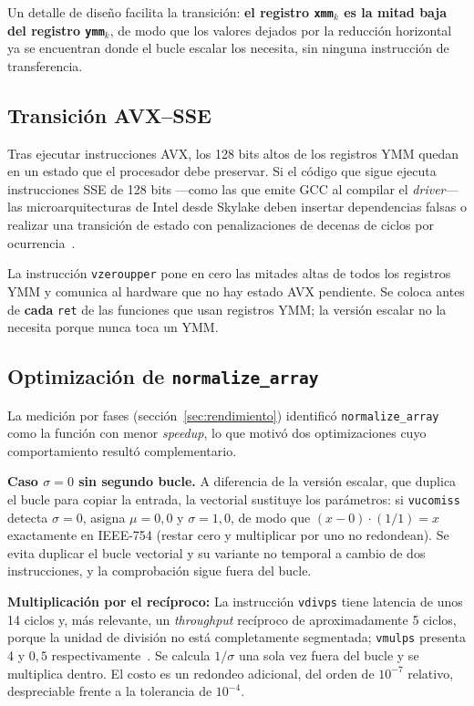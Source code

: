 \documentclass[journal]{IEEEtran}
\begin{document}
Un detalle de diseño facilita la transición: \textbf{el registro
\texttt{xmm}$_k$ es la mitad baja del registro \texttt{ymm}$_k$}, de modo
que los valores dejados por la reducción horizontal ya se encuentran
donde el bucle escalar los necesita, sin ninguna instrucción de
transferencia.

\subsection{Transición AVX--SSE}

Tras ejecutar instrucciones AVX, los 128 bits altos de los registros YMM
quedan en un estado que el procesador debe preservar. Si el código que
sigue ejecuta instrucciones SSE de 128 bits ---como las que emite GCC al
compilar el \textit{driver}--- las microarquitecturas de Intel desde
Skylake deben insertar dependencias falsas o realizar una transición de
estado con penalizaciones de decenas de ciclos por
ocurrencia~\cite{intel_optimization}.

La instrucción \texttt{vzeroupper} pone en cero las mitades altas de
todos los registros YMM y comunica al hardware que no hay estado AVX
pendiente. Se coloca antes de \textbf{cada} \texttt{ret} de las funciones
que usan registros YMM; la versión escalar no la necesita porque nunca
toca un YMM.

\subsection{Optimización de \texttt{normalize\_array}}
\label{sec:optimizacion}

La medición por fases (sección~\ref{sec:rendimiento}) identificó
\texttt{normalize\_array} como la función con menor \textit{speedup}, lo
que motivó dos optimizaciones cuyo comportamiento resultó
complementario.

\textbf{Caso $\sigma = 0$ sin segundo bucle.} A diferencia de la versión
escalar, que duplica el bucle para copiar la entrada, la vectorial
sustituye los parámetros: si \texttt{vucomiss} detecta $\sigma = 0$,
asigna $\mu = 0{,}0$ y $\sigma = 1{,}0$, de modo que
$(x - 0)\cdot(1/1) = x$ exactamente en IEEE-754 (restar cero y
multiplicar por uno no redondean). Se evita duplicar el bucle
vectorial y su variante no temporal a cambio de dos instrucciones, y la
comprobación sigue fuera del bucle.

\textbf{Multiplicación por el recíproco:} La instrucción
\texttt{vdivps} tiene latencia de unos 14 ciclos y, más relevante, un
\textit{throughput} recíproco de aproximadamente 5 ciclos, porque la
unidad de división no está completamente segmentada; \texttt{vmulps}
presenta 4 y $0,5$ respectivamente~\cite{agner_tables}. Se calcula
$1/\sigma$ una sola vez fuera del bucle y se multiplica dentro. El costo
es un redondeo adicional, del orden de $10^{-7}$ relativo, despreciable
frente a la tolerancia de $10^{-4}$.
\end{document}

